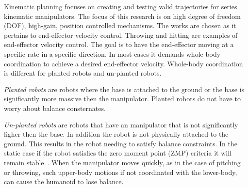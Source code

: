 Kinematic planning focuses on creating and testing valid trajectories for series kinematic manipulators.
The focus of this research is on high degree of freedom (DOF), high-gain, position controlled mechanisms.
The works are chosen as it pertains to end-effector velocity control.
Throwing and hitting are examples of end-effector velocity control.  
The goal is to have the end-effector moving at a specific rate in a specific direction.
In most cases it demands whole-body coordination to achieve a desired end-effector velocity.  
Whole-body coordination is different for planted robots and un-planted robots.  


\noindent \textit{Planted robots} are robots where the base is attached to the ground or the base is significantly more massive then the manipulator.
Planted robots do not have to worry about balance consternates. 

\noindent \textit{Un-planted robots} are robots that have an manipulator that is not significantly ligher then the base.  
In addition the robot is not physically attached to the ground.
This results in the robot needing to satisfy balance constraints.
In the static case if the robot satisfies the zero moment point (ZMP) criteria it will remain stable~\cite{5686276}.
When the manipulator moves quickly, as in the case of pitching or throwing, such upper-body motions if not coordinated with the lower-body, can cause the humanoid to lose balance.  




